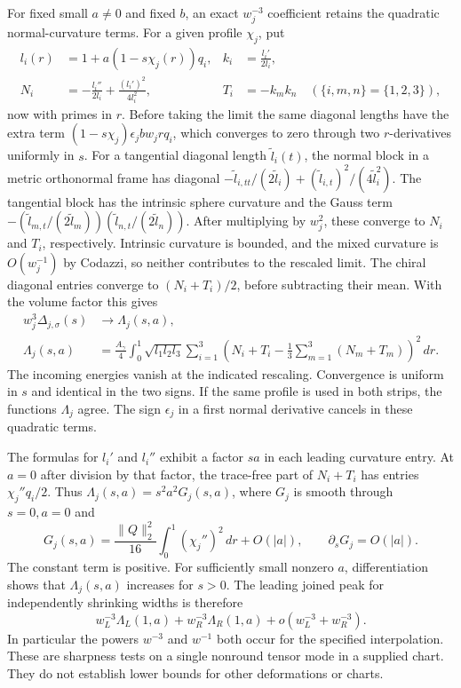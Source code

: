 \documentclass[11pt,letterpaper]{article}
\numberwithin{equation}{section}
\newcommand{\rd}{\gamma}
\begin{document}
For fixed small \(a\ne0\) and fixed \(b\), an exact
\(w_j^{-3}\) coefficient retains the quadratic normal-curvature
terms. For a given profile \(\chi_j\), put
\[
 \begin{aligned}
 l_i(r)&=1+a(1-s\chi_j(r))q_i, & k_i&=\frac{l_i'}{2l_i},\\
 N_i&=-\frac{l_i''}{2l_i}+\frac{(l_i')^2}{4l_i^2}, &
 T_i&=-k_m k_n \quad(\{i,m,n\}=\{1,2,3\}),
 \end{aligned}
\]
now with primes in \(r\).
Before taking the limit the same diagonal lengths have the
extra term \((1-s\chi_j)\epsilon_j b w_j r q_i\), which
converges to zero through two \(r\)-derivatives uniformly in \(s\).
For a tangential diagonal length \(\widetilde l_i(t)\), the
normal block in a metric orthonormal frame has diagonal
\(-\widetilde l_{i,tt}/(2\widetilde l_i)
 +(\widetilde l_{i,t})^2/(4\widetilde l_i^2)\).
The tangential block has the intrinsic sphere curvature and
the Gauss term
\(-(\widetilde l_{m,t}/(2\widetilde l_m))
  (\widetilde l_{n,t}/(2\widetilde l_n))\).
After multiplying by \(w_j^2\), these converge to \(N_i\) and
\(T_i\), respectively. Intrinsic curvature is bounded, and the
mixed curvature is \(O(w_j^{-1})\) by Codazzi, so neither
contributes to the rescaled limit. The chiral diagonal
entries converge to \((N_i+T_i)/2\), before subtracting their
mean. With the volume factor this gives
\begin{equation}
 \begin{aligned}
 w_j^3\Delta_{j,\sigma}(s)&\longrightarrow\Lambda_j(s,a),\\
 \Lambda_j(s,a)
 &=\frac{A_\rd}{4}\int_0^1\sqrt{l_1l_2l_3}
   \sum_{i=1}^3
   \left(N_i+T_i-\frac13\sum_{m=1}^3(N_m+T_m)\right)^2\,dr.
 \end{aligned}
 \label{eq:fixed-a}
\end{equation}
The incoming energies vanish at the indicated rescaling.
Convergence is uniform in \(s\) and identical in the two signs.
If the same profile is used in both strips, the functions
\(\Lambda_j\) agree. The sign \(\epsilon_j\) in a first
normal derivative cancels in these quadratic terms.

The formulas for \(l_i'\) and \(l_i''\) exhibit a factor \(sa\)
in each leading curvature entry. At \(a=0\) after division by that
factor, the trace-free part of \(N_i+T_i\) has entries
\(\chi_j''q_i/2\). Thus
\(\Lambda_j(s,a)=s^2a^2 G_j(s,a)\), where \(G_j\) is smooth
through \(s=0,a=0\) and
\[
 G_j(s,a)=\frac{\|Q\|_2^2}{16}\int_0^1(\chi_j'')^2\,dr+O(|a|),
 \qquad \partial_s G_j=O(|a|).
\]
The constant term is positive. For sufficiently small nonzero
\(a\), differentiation shows that \(\Lambda_j(s,a)\)
increases for \(s>0\). The leading joined peak for independently
shrinking widths is therefore
\[
 w_L^{-3}\Lambda_L(1,a)+w_R^{-3}\Lambda_R(1,a)
      +o(w_L^{-3}+w_R^{-3}) .
\]
In particular the powers \(w^{-3}\) and \(w^{-1}\) both occur
for the specified interpolation. These are sharpness tests on
a single nonround tensor mode in a supplied chart. They do
not establish lower bounds for other deformations or charts.
\end{document}
